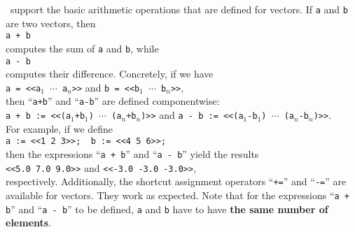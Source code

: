 \setlx\ support the basic arithmetic operations that are defined for vectors.  If \texttt{a} and
\texttt{b} are two vectors, then 
\\[0.2cm]
\hspace*{1.3cm}
\texttt{a + b}
\\[0.2cm]
computes the sum of \texttt{a} and \texttt{b}, while 
\\[0.2cm]
\hspace*{1.3cm}
\texttt{a - b}
\\[0.2cm]
computes their difference.  Concretely, if we have
\\[0.2cm]
\hspace*{1.3cm}
\texttt{a = <<a$_1$ $\cdots$ a$_n$>>} \quad and \quad
\texttt{b = <<b$_1$ $\cdots$ b$_n$>>},
\\[0.2cm]
then ``\texttt{a+b}'' and ``\texttt{a-b}'' are defined componentwise:
\\[0.2cm]
\hspace*{1.3cm}
\texttt{a + b := <<(a$_1$+b$_1$) $\cdots$ (a$_n$+b$_n$)>>} \quad and \quad
\texttt{a - b := <<(a$_1$-b$_1$) $\cdots$ (a$_n$-b$_n$)>>}.
\\[0.2cm]
For example, if we define
\\[0.2cm]
\hspace*{1.3cm}
\texttt{a := <<1 2 3>>; \ b := <<4 5 6>>;}
\\[0.2cm]
then the expressions ``\texttt{a + b}'' and ``\texttt{a - b}'' yield the results
\\[0.2cm]
\hspace*{1.3cm}
\texttt{<<5.0 7.0 9.0>>} \quad and \quad \texttt{<<-3.0 -3.0 -3.0>>},
\\[0.2cm]
respectively.  Additionally, the shortcut assignment operators ``\texttt{+=}'' and ``\texttt{-=}''
are available for vectors.  They work as expected.  Note that for the expressions ``\texttt{a + b}''
and ``\texttt{a - b}'' to be defined, \texttt{a} and \texttt{b} have to have 
\textbf{the same number of elements}. 

